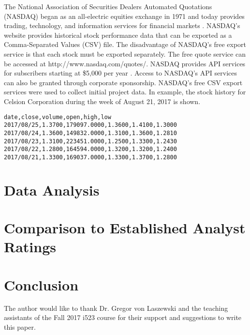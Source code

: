 \documentclass[sigconf]{acmart}
\begin{document}
The National Association of Securities Dealers Automated Quotations (NASDAQ) began as an all-electric equities exchange in 1971 and today provides trading, technology, and information services for financial markets  \cite{www-nasdaq}. NASDAQ's website provides historical stock performance data that can be exported as a Comma-Separated Values (CSV) file. The disadvantage of NASDAQ's free export service is that each stock must be exported separately. The free quote service can be accessed at http://www.nasdaq.com/quotes/. NASDAQ provides API services for subscribers starting at \$5,000 per year \cite{www-nasdaq-sub}. Access to NASDAQ's API services can also be granted through corporate sponsorship. NASDAQ's free CSV export services were used to collect initial project data. In example, the stock history for Celsion Corporation during the week of August 21, 2017 is shown.

\begin{mdframed}[style=default]
\begin{lstlisting}
date,close,volume,open,high,low
2017/08/25,1.3700,179097.0000,1.3600,1.4100,1.3000
2017/08/24,1.3600,149832.0000,1.3100,1.3600,1.2810
2017/08/23,1.3100,223451.0000,1.2500,1.3300,1.2430
2017/08/22,1.2800,164594.0000,1.3200,1.3200,1.2400
2017/08/21,1.3300,169037.0000,1.3300,1.3700,1.2800
\end{lstlisting}
\end{mdframed} 




\section{Data Analysis}


\section{Comparison to Established Analyst Ratings}


\section{Conclusion}


\begin{acks}

The author would like to thank Dr. Gregor von Laszewski and the teaching assistants of the Fall 2017 i523 course for their support and suggestions to write this paper.

\end{acks}


 
\end{document}
